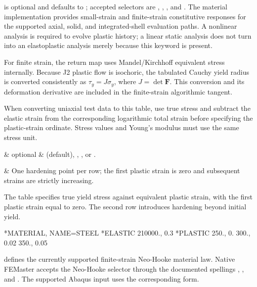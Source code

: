  is optional and defaults to ; accepted selectors are , , , and . The material implementation provides small-strain and finite-strain constitutive responses for the supported axial, solid, and integrated-shell evaluation paths. A nonlinear analysis is required to evolve plastic history; a linear static analysis does not turn into an elastoplastic analysis merely because this keyword is present.

For finite strain, the return map uses Mandel/Kirchhoff equivalent stress internally. Because J2 plastic flow is isochoric, the tabulated Cauchy yield radius is converted consistently as \(\tau_y=J\sigma_y\), where \(J=\det\mathbf F\). This conversion and its deformation derivative are included in the finite-strain algorithmic tangent.

When converting uniaxial test data to this table, use true stress and subtract the elastic strain from the corresponding logarithmic total strain before specifying the plastic-strain ordinate. Stress values and Young's modulus must use the same stress unit.

\begin{keywordparameters}
 & optional &  (default), , , or . \\
\end{keywordparameters}

\begin{keyworddata}
 & One hardening point per row; the first plastic strain is zero and subsequent strains are strictly increasing. \\
\end{keyworddata}

The table specifies true yield stress against equivalent plastic strain, with the first plastic strain equal to zero. The second row introduces hardening beyond initial yield.

\exampleheading

\begin{inputdeck}
*MATERIAL, NAME=STEEL
*ELASTIC
210000., 0.3
*PLASTIC
250., 0.
300., 0.02
350., 0.05
\end{inputdeck}


 defines the currently supported finite-strain Neo-Hooke material law. Native FEMaster accepts the Neo-Hooke selector through the documented spellings , , and . The supported Abaqus input uses the corresponding  form.

